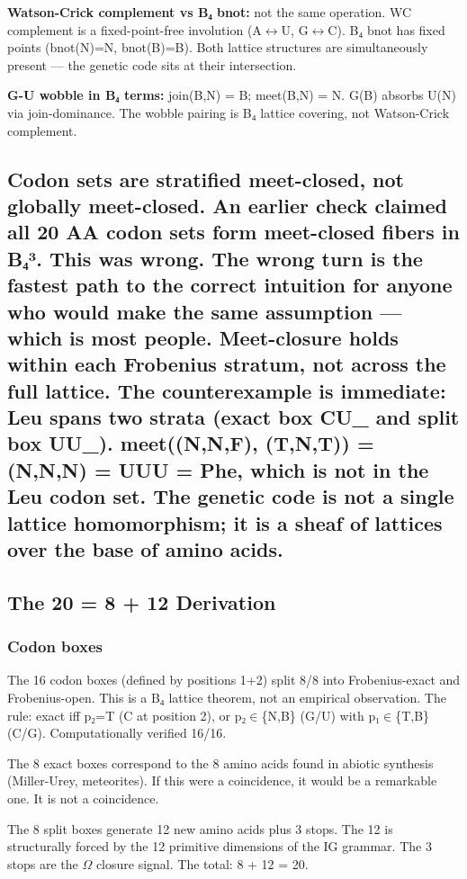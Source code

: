 \documentclass[12pt,a4paper]{article}
\begin{document}
\textbf{Watson-Crick complement vs B₄ bnot:} not the same operation. WC complement is a fixed-point-free involution (A$\leftrightarrow$U, G$\leftrightarrow$C). B₄ bnot has fixed points (bnot(N)=N, bnot(B)=B). Both lattice structures are simultaneously present --- the genetic code sits at their intersection.

\textbf{G-U wobble in B₄ terms:} join(B,N) = B; meet(B,N) = N. G(B) absorbs U(N) via join-dominance. The wobble pairing is B₄ lattice covering, not Watson-Crick complement.

\subsection{\textbf{Codon sets are stratified meet-closed, not globally meet-closed.} An earlier check claimed all 20 AA codon sets form meet-closed fibers in B₄³. This was wrong. The wrong turn is the fastest path to the correct intuition for anyone who would make the same assumption --- which is most people. Meet-closure holds within each Frobenius stratum, not across the full lattice. The counterexample is immediate: Leu spans two strata (exact box CU\_ and split box UU\_). meet((N,N,F), (T,N,T)) = (N,N,N) = UUU = Phe, which is not in the Leu codon set. The genetic code is not a single lattice homomorphism; it is a sheaf of lattices over the base of amino acids.}

\subsection{The 20 = 8 + 12 Derivation}

\subsubsection{Codon boxes}

The 16 codon boxes (defined by positions 1+2) split 8/8 into Frobenius-exact and Frobenius-open. This is a B₄ lattice theorem, not an empirical observation. The rule: exact iff p₂=T (C at position 2), or p₂$\in$\{N,B\} (G/U) with p₁$\in$\{T,B\} (C/G). Computationally verified 16/16.

The 8 exact boxes correspond to the 8 amino acids found in abiotic synthesis (Miller-Urey, meteorites). If this were a coincidence, it would be a remarkable one. It is not a coincidence.

The 8 split boxes generate 12 new amino acids plus 3 stops. The 12 is structurally forced by the 12 primitive dimensions of the IG grammar. The 3 stops are the $\Omega$ closure signal. The total: 8 + 12 = 20.
\end{document}
